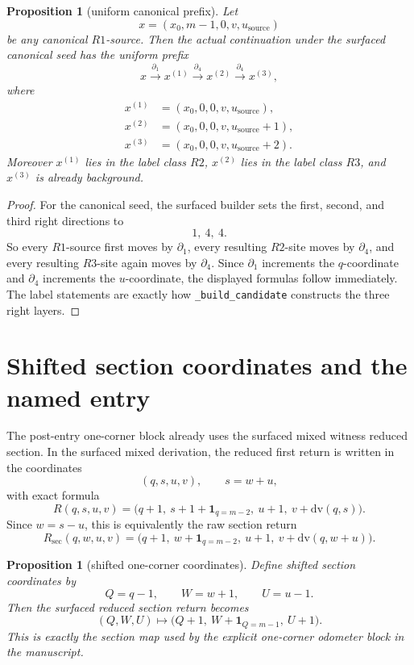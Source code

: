 \documentclass[11pt]{article}
\newtheorem{proposition}[theorem]{Proposition}
\begin{document}
\begin{proposition}[uniform canonical prefix]
Let
\[
x=(x_0,m-1,0,v,u_{\mathrm{source}})
\]
be any canonical \(R1\)-source.
Then the actual continuation under the surfaced canonical seed has the uniform
prefix
\[
x \xrightarrow{\partial_1} x^{(1)} \xrightarrow{\partial_4} x^{(2)}
\xrightarrow{\partial_4} x^{(3)},
\]
where
\begin{align*}
x^{(1)} &= (x_0,0,0,v,u_{\mathrm{source}}),\\
x^{(2)} &= (x_0,0,0,v,u_{\mathrm{source}}+1),\\
x^{(3)} &= (x_0,0,0,v,u_{\mathrm{source}}+2).
\end{align*}
Moreover \(x^{(1)}\) lies in the label class \(R2\), \(x^{(2)}\) lies in the
label class \(R3\), and \(x^{(3)}\) is already background.
\end{proposition}

\begin{proof}
For the canonical seed, the surfaced builder sets the first, second, and third
right directions to
\[
1,\ 4,\ 4.
\]
So every \(R1\)-source first moves by \(\partial_1\), every resulting \(R2\)-site
moves by \(\partial_4\), and every resulting \(R3\)-site again moves by
\(\partial_4\).  Since \(\partial_1\) increments the \(q\)-coordinate and
\(\partial_4\) increments the \(u\)-coordinate, the displayed formulas follow
immediately.
The label statements are exactly how \texttt{\_build\_candidate} constructs the
three right layers.
\end{proof}

\section{Shifted section coordinates and the named entry}

The post-entry one-corner block already uses the surfaced mixed witness reduced
section.  In the surfaced mixed derivation, the reduced first return is written
in the coordinates
\[
(q,s,u,v),\qquad s=w+u,
\]
with exact formula
\[
R(q,s,u,v)=\bigl(q+1,\ s+1+\mathbf 1_{q=m-2},\ u+1,\ v+\mathrm{dv}(q,s)\bigr).
\]
Since \(w=s-u\), this is equivalently the raw section return
\[
R_{\mathrm{sec}}(q,w,u,v)
=
\bigl(q+1,\ w+\mathbf 1_{q=m-2},\ u+1,\ v+\mathrm{dv}(q,w+u)\bigr).
\]

\begin{proposition}[shifted one-corner coordinates]
Define shifted section coordinates by
\[
Q=q-1,\qquad W=w+1,\qquad U=u-1.
\]
Then the surfaced reduced section return becomes
\[
(Q,W,U)\longmapsto
\bigl(Q+1,\ W+\mathbf 1_{Q=m-1},\ U+1\bigr).
\]
This is exactly the section map used by the explicit one-corner odometer block
in the manuscript.
\end{proposition}
\end{document}
